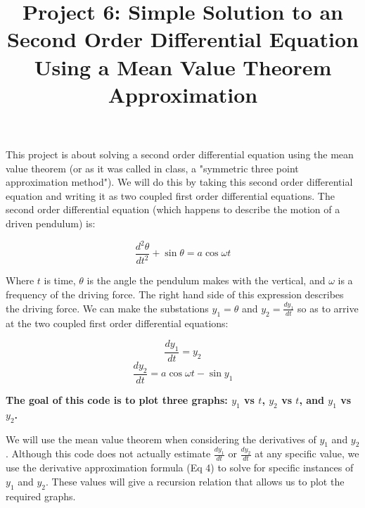 \documentclass[11pt]{amsart}
\title{Project 6: Simple Solution to an Second Order Differential Equation Using a Mean Value Theorem Approximation}
\begin{document}
\maketitle

This project is about solving a second order differential equation using the mean value theorem (or as it was called in class, a "symmetric three point approximation method").  We will do this by taking this second order differential equation and writing it as two coupled first order differential equations.  The second order differential equation (which happens to describe the motion of a driven pendulum) is:

\begin{equation}
\frac{d^{2} \theta}{d t^{2}} + \sin{\theta} = a \cos{\omega t}
\end{equation}
\vspace{2 mm}

Where $t$ is time, $\theta$ is the angle the pendulum makes with the vertical, and $\omega$ is a frequency of the driving force.  The right hand side of this expression describes the driving force.  We can make the substations $y_1 = \theta$ and $y_2 = \frac{d y_1}{d t}$ so as to arrive at the two coupled first order differential equations:

\begin{equation}
\frac{d y_1}{dt} = y_2
\end{equation}
\begin{equation}
\frac{d y_2}{dt} = a \cos{\omega t}- \sin{y_1}
\end{equation}
\vspace{2 mm}

\textbf{The goal of this code is to plot three graphs: $y_1$ vs $t$, $y_2$ vs $t$, and $y_1$ vs $y_2$.}
\newline

We will use the mean value theorem when considering the derivatives of $y_1$ and $y_2$.  Although this code does not actually estimate $\frac{d y_1}{dt}$ or $\frac{d y_2}{dt}$ at any specific value, we use the derivative approximation formula (Eq 4) to solve for specific instances of $y_1$ and $y_2$.  These values will give a recursion relation that allows us to plot the required graphs.
\newline
\end{document}
